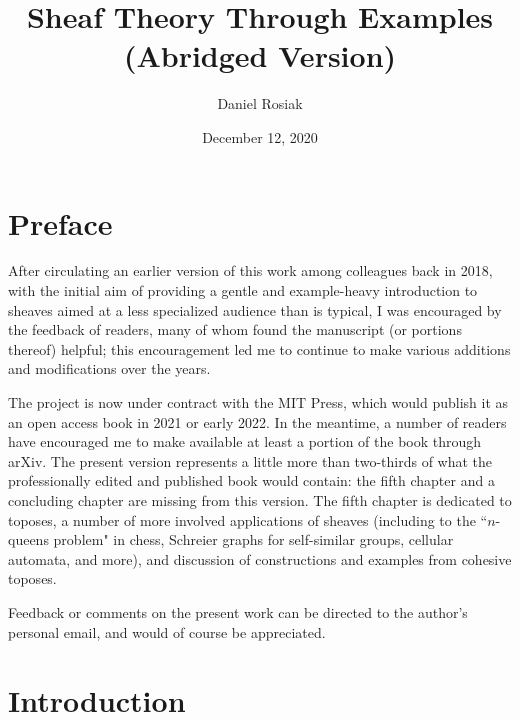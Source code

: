 \documentclass[a4paper]{book}
\title{Sheaf Theory Through Examples \\ (\textbf{Abridged Version})}
\author{Daniel Rosiak}
\date{December 12, 2020}
\theoremstyle{definition}
\theoremstyle{definition}
\theoremstyle{definition}
\theoremstyle{theorem}
\theoremstyle{definition}
\begin{document}
	\maketitle 
	\chapter*{Preface} 
	After circulating an earlier version of this work among colleagues back in 2018, with the initial aim of providing a gentle and example-heavy introduction to sheaves aimed at a less specialized audience than is typical, I was encouraged by the feedback of readers, many of whom found the manuscript (or portions thereof) helpful; this encouragement led me to continue to make various additions and modifications over the years. \par 
	The project is now under contract with the MIT Press, which would publish it as an open access book in 2021 or early 2022. In the meantime, a number of readers have encouraged me to make available at least a portion of the book through arXiv. The present version represents a little more than two-thirds of what the professionally edited and published book would contain: the fifth chapter and a concluding chapter are missing from this version. The fifth chapter is dedicated to toposes, a number of more involved applications of sheaves (including to the ``$n$-queens problem" in chess, Schreier graphs for self-similar groups, cellular automata, and more), and discussion of constructions and examples from cohesive toposes.\par 
	
	Feedback or comments on the present work can be directed to the author's personal email, and would of course be appreciated.    
	\tableofcontents
	\newpage
	
	\chapter*{Introduction} 
\end{document}
